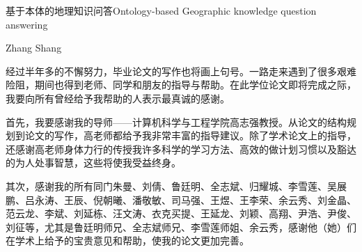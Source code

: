 \documentclass[nomlist,masters,openany]{seuthesix}
\begin{document}
\title{\quad}{基于本体的地理知识问答}{\quad}{Ontology-based Geographic knowledge question answering}
\author{张赏}{Zhang Shang}
\committeechair{}
\makebigcover
\makecover


\tableofcontents
\listofothers

\mainmatter







%



\acknowledgement
经过半年多的不懈努力，毕业论文的写作也将画上句号。一路走来遇到了很多艰难险阻，期间也得到老师、同学和朋友的指导与帮助。在此学位论文即将完成之际，我要向所有曾经给予我帮助的人表示最真诚的感谢。

首先，我要感谢我的导师——计算机科学与工程学院高志强教授。从论文的结构规划到论文的写作，高老师都给予我非常丰富的指导建议。除了学术论文上的指导，还感谢高老师身体力行的传授我许多科学的学习方法、高效的做计划习惯以及豁达的为人处事智慧，这些将使我受益终身。

其次，感谢我的所有同门朱曼、刘倩、鲁廷明、全志斌、归耀城、李雪莲、吴展鹏、吕永涛、王辰、倪朝曦、潘敬敏、司马强、王煜、王李荣、余云秀、刘金晶、范云龙、李斌、刘延栋、汪文涛、衣克买提、王延龙、刘颖、高翔、尹浩、尹俊、刘征等，尤其是鲁廷明师兄、全志斌师兄、李雪莲师姐、余云秀，感谢他（她）们在学术上给予的宝贵意见和帮助，使我的论文更加完善。
\end{document}
